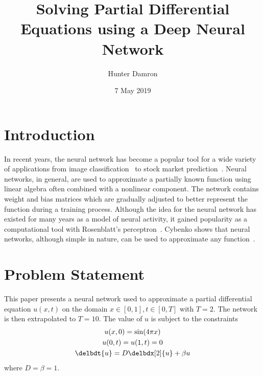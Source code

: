 \documentclass{article}
\title{Solving Partial Differential Equations using a Deep Neural Network}
\author{Hunter Damron}
\date{7 May 2019}
\begin{document}
  \maketitle

  \section{Introduction}
    In recent years, the neural network has become a popular tool for a wide variety of applications from image classification~\cite{lenet5} to stock market prediction~\cite{stock}. Neural networks, in general, are used to approximate a partially known function using linear algebra often combined with a nonlinear component. The network contains weight and bias matrices which are gradually adjusted to better represent the function during a training process. Although the idea for the neural network has existed for many years as a model of neural activity, it gained popularity as a computational tool with Rosenblatt's perceptron~\cite{rosenblatt}. Cybenko shows that neural networks, although simple in nature, can be used to approximate any function~\cite{approx}.

  \section{Problem Statement}
    This paper presents a neural network used to approximate a partial differential equation $u(x,t)$ on the domain $x \in [0,1], t \in [0,T]$ with $T=2$. The network is then extrapolated to $T=10$. The value of $u$ is subject to the constraints
    \begin{subequations}\label{eqn:pde}
    \begin{gather}
      u(x,0) = \sin(4 \pi x) \label{eqn:x} \\
      u(0,t) = u(1,t) = 0 \label{eqn:t} \\
      \delbdt{u} = D \delbdx[2]{u} + \beta u \label{eqn:de}
    \end{gather}
    \end{subequations}
    where $D = \beta = 1$.
\end{document}
